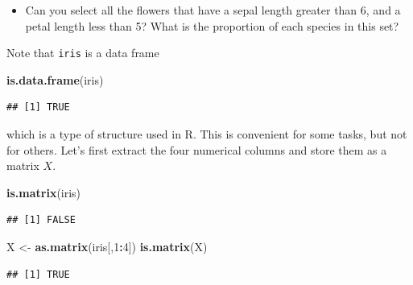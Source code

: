 \documentclass[]{book}
\newenvironment{Shaded}{\begin{snugshade}}{\end{snugshade}}
\newcommand{\DecValTok}[1]{\textcolor[rgb]{0.00,0.00,0.81}{#1}}
\newcommand{\FloatTok}[1]{\textcolor[rgb]{0.00,0.00,0.81}{#1}}
\newcommand{\KeywordTok}[1]{\textcolor[rgb]{0.13,0.29,0.53}{\textbf{#1}}}
\newcommand{\NormalTok}[1]{#1}
\newcommand{\OperatorTok}[1]{\textcolor[rgb]{0.81,0.36,0.00}{\textbf{#1}}}
\newcommand{\StringTok}[1]{\textcolor[rgb]{0.31,0.60,0.02}{#1}}
\providecommand{\tightlist}{%
  \setlength{\itemsep}{0pt}\setlength{\parskip}{0pt}}
\theoremstyle{definition}
\theoremstyle{definition}
\theoremstyle{definition}
\theoremstyle{remark}
\begin{document}
\begin{Shaded}
\end{Shaded}

\begin{itemize}
\tightlist
\item
  Can you select all the flowers that have a sepal length greater than 6, and a petal length less than 5? What is the proportion of each species in this set?
\end{itemize}

Note that \texttt{iris} is a data frame

\begin{Shaded}
\begin{Highlighting}[]
\KeywordTok{is.data.frame}\NormalTok{(iris)}
\end{Highlighting}
\end{Shaded}

\begin{verbatim}
## [1] TRUE
\end{verbatim}

which is a type of structure used in R. This is convenient for some tasks, but not for others. Let's first extract the four numerical columns and store them as a matrix \(X\).

\begin{Shaded}
\begin{Highlighting}[]
\KeywordTok{is.matrix}\NormalTok{(iris)}
\end{Highlighting}
\end{Shaded}

\begin{verbatim}
## [1] FALSE
\end{verbatim}

\begin{Shaded}
\begin{Highlighting}[]
\NormalTok{X <-}\StringTok{ }\KeywordTok{as.matrix}\NormalTok{(iris[,}\DecValTok{1}\OperatorTok{:}\DecValTok{4}\NormalTok{])}
\KeywordTok{is.matrix}\NormalTok{(X)}
\end{Highlighting}
\end{Shaded}

\begin{verbatim}
## [1] TRUE
\end{verbatim}
\end{document}
